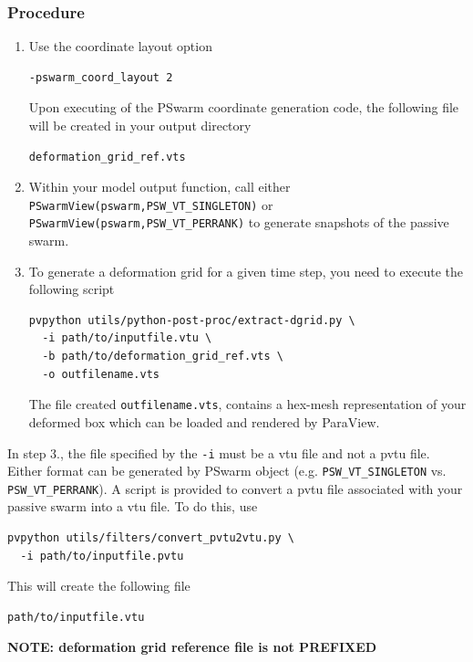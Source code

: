 \documentclass[paper=a4, fontsize=10pt,twoside]{scrartcl}
\begin{document}
{{\subsubsection*{Procedure}
\begin{enumerate}

\item Use the coordinate layout option
\begin{lstlisting}
-pswarm_coord_layout 2
\end{lstlisting}
Upon executing of the PSwarm coordinate generation code, the following file will be created in your output directory
\begin{lstlisting}
deformation_grid_ref.vts
\end{lstlisting}

\item Within your model output function, call either
\texttt{PSwarmView(pswarm,PSW\_VT\_SINGLETON)}
or
\texttt{PSwarmView(pswarm,PSW\_VT\_PERRANK)}
to generate snapshots of the passive swarm.

\item To generate a deformation grid for a given time step, you need to execute the following script
\begin{lstlisting}
pvpython utils/python-post-proc/extract-dgrid.py \
  -i path/to/inputfile.vtu \
  -b path/to/deformation_grid_ref.vts \
  -o outfilename.vts
\end{lstlisting}
The file created {\tt outfilename.vts}, contains a hex-mesh representation of your deformed box which can be loaded and rendered by ParaView.
\end{enumerate}

In step 3., the file specified by the \texttt{-i} must be a vtu file and not a pvtu file.
Either format can be generated by PSwarm object (e.g. \texttt{PSW\_VT\_SINGLETON} vs. \texttt{PSW\_VT\_PERRANK}).
A script is provided to convert a pvtu file associated with your passive swarm into a vtu file.
To do this, use
\begin{lstlisting}
pvpython utils/filters/convert_pvtu2vtu.py \
  -i path/to/inputfile.pvtu
\end{lstlisting}

This will create the following file
\begin{lstlisting}
path/to/inputfile.vtu
\end{lstlisting}

\textbf{NOTE: deformation grid reference file is not PREFIXED}

}}
\end{document}
